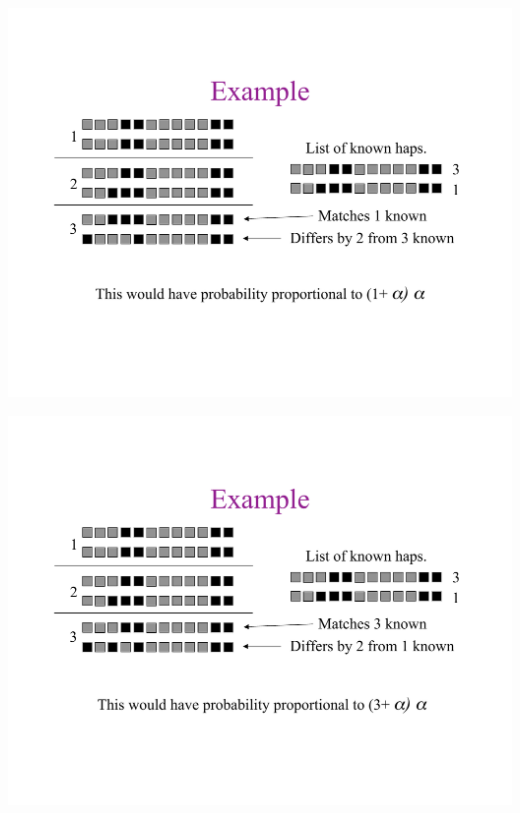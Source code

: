 \newslide{}
\mbox{}
\vspace*{\VertUp}
\enlargethispage*{1000pt}
\begin{center}
\includegraphics*[width=\textwidth]{PPT_pages/pg_0039.pdf}
\end{center}


\newslide{}
\mbox{}
\vspace*{\VertUp}
\enlargethispage*{1000pt}
\begin{center}
\includegraphics*[width=\textwidth]{PPT_pages/pg_0040.pdf}
\end{center}


